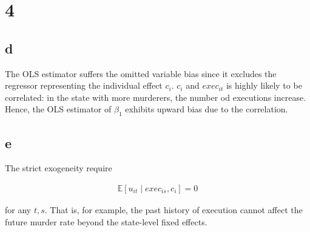 \documentclass[11pt]{article}
\newcommand{\E}{\mathbb{E}}
\theoremstyle{definition}
\begin{document}
\section*{4}

\subsection*{d}

The OLS estimator suffers the omitted variable bias since it excludes the regressor representing the individual effect $c_i$. $c_i$ and $exec_{it}$ is highly likely to be correlated: in the state with more murderers, the number od executions increase. Hence, the OLS estimator of $\beta_1$ exhibits upward bias due to the correlation.

\subsection*{e}

The strict exogeneity require

\begin{align*}
    \E[u_{it} \mid exec_{is}, c_i] = 0
\end{align*}

for any $t, s$. That is, for example, the past history of execution cannot affect the future murder rate beyond the state-level fixed effects.
\end{document}

